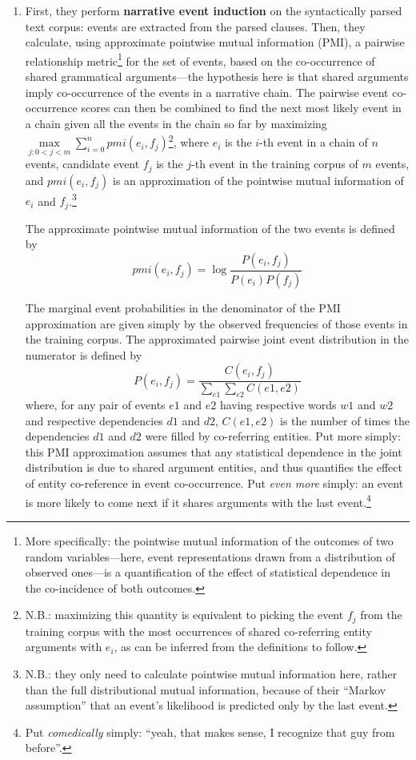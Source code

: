 \begin{enumerate}
\item First, they perform \textbf{narrative event induction} on the syntactically parsed text corpus: events are extracted from the parsed clauses. Then, they calculate, using approximate pointwise mutual information (PMI), a pairwise relationship metric\footnote{More specifically: the pointwise mutual information of the outcomes of two random variables---here, event representations drawn from a distribution of observed ones---is a quantification of the effect of statistical dependence in the co-incidence of both outcomes.} for the set of events, based on the co-occurrence of shared grammatical arguments---the hypothesis here is that shared arguments imply co-occurrence of the events in a narrative chain. The pairwise event co-occurrence scores can then be combined to find the next most likely event in a chain given all the events in the chain so far by maximizing $\max\limits_{{j:0<j<m}} \sum\limits_{i=0}^{n} pmi(e_{i}, f_{j})$\footnote{N.B.: maximizing this quantity is equivalent to picking the event $f_{j}$ from the training corpus with the most occurrences of shared co-referring entity arguments with $e_{i}$, as can be inferred from the definitions to follow.}, where $e_{i}$ is the $i$-th event in a chain of $n$ events, candidate event $f_{j}$ is the $j$-th event in the training corpus of $m$ events, and $pmi(e_{i}, f_{j})$ is an approximation of the pointwise mutual information of $e_{i}$ and $f_{j}$.\footnote{N.B.: they only need to calculate pointwise mutual information here, rather than the full distributional mutual information, because of their ``Markov assumption'' that an event's likelihood is predicted only by the last event.}

The approximate pointwise mutual information of the two events is defined by $$pmi(e_{i}, f_{j}) = \log \frac{P(e_{i}, f_{j})}{P(e_{i}) P(f_{j})}$$

The marginal event probabilities in the denominator of the PMI approximation are given simply by the observed frequencies of those events in the training corpus. The approximated pairwise joint event distribution in the numerator is defined by $$P(e_{i}, f_{j}) = \frac{C(e_{i}, f_{j})}{\sum_{e1}\sum_{e2} C(e1, e2)}$$ where, for any pair of events $e1$ and $e2$ having respective words $w1$ and $w2$ and respective dependencies $d1$ and $d2$, $C(e1, e2)$ is the number of times the dependencies $d1$ and $d2$ were filled by co-referring entities. Put more simply: this PMI approximation assumes that any statistical dependence in the joint distribution is due to shared argument entities, and thus quantifies the effect of entity co-reference in event co-occurrence. Put \textit{even more} simply: an event is more likely to come next if it shares arguments with the last event.\footnote{Put \textit{comedically} simply: ``yeah, that makes sense, I recognize that guy from before''.}


\end{enumerate}
